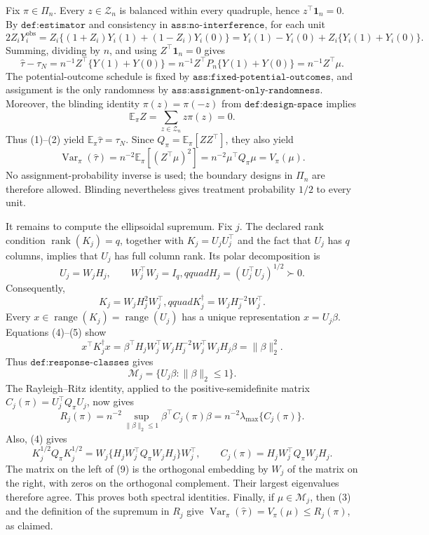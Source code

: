 Fix \(\pi\in\Pi_n\).  Every \(z\in\mathcal Z_n\) is balanced within every quadruple, hence \(z^\top\mathbf 1_n=0\).  By \(\texttt{def:estimator}\) and consistency in \(\texttt{ass:no-interference}\), for each unit
\[
2Z_iY_i^{\mathrm{obs}}
=Z_i\{(1+Z_i)Y_i(1)+(1-Z_i)Y_i(0)\}
=Y_i(1)-Y_i(0)+Z_i\{Y_i(1)+Y_i(0)\}.
\]
Summing, dividing by \(n\), and using \(Z^\top\mathbf 1_n=0\) gives
\[
\widehat\tau-\tau_N
=n^{-1}Z^\top\{Y(1)+Y(0)\}
=n^{-1}Z^\top P_n\{Y(1)+Y(0)\}
=n^{-1}Z^\top\mu. \tag{1}
\]
The potential-outcome schedule is fixed by \(\texttt{ass:fixed-potential-outcomes}\), and assignment is the only randomness by \(\texttt{ass:assignment-only-randomness}\).  Moreover, the blinding identity \(\pi(z)=\pi(-z)\) from \(\texttt{def:design-space}\) implies
\[
\mathbb E_\pi Z=\sum_{z\in\mathcal Z_n}z\pi(z)=0. \tag{2}
\]
Thus (1)--(2) yield \(\mathbb E_\pi\widehat\tau=\tau_N\).  Since \(Q_\pi=\mathbb E_\pi[ZZ^\top]\), they also yield
\[
\operatorname{Var}_\pi(\widehat\tau)
=n^{-2}\mathbb E_\pi[(Z^\top\mu)^2]
=n^{-2}\mu^\top Q_\pi\mu
=V_\pi(\mu). \tag{3}
\]
No assignment-probability inverse is used; the boundary designs in \(\Pi_n\) are therefore allowed.  Blinding nevertheless gives treatment probability \(1/2\) to every unit.

It remains to compute the ellipsoidal supremum.  Fix \(j\).  The declared rank condition \(\operatorname{rank}(K_j)=q\), together with \(K_j=U_jU_j^\top\) and the fact that \(U_j\) has \(q\) columns, implies that \(U_j\) has full column rank.  Its polar decomposition is
\[
U_j=W_jH_j,\qquad W_j^\top W_j=I_q,qquad H_j=(U_j^\top U_j)^{1/2}\succ0. \tag{4}
\]
Consequently,
\[
K_j=W_jH_j^2W_j^\top,qquad
K_j^\dagger=W_jH_j^{-2}W_j^\top. \tag{5}
\]
Every \(x\in\operatorname{range}(K_j)=\operatorname{range}(U_j)\) has a unique representation \(x=U_j\beta\).  Equations (4)--(5) show
\[
x^\top K_j^\dagger x
=\beta^\top H_jW_j^\top W_jH_j^{-2}W_j^\top W_jH_j\beta
=\|\beta\|_2^2. \tag{6}
\]
Thus \(\texttt{def:response-classes}\) gives
\[
\mathcal M_j=\{U_j\beta:\|\beta\|_2\le1\}. \tag{7}
\]
The Rayleigh--Ritz identity, applied to the positive-semidefinite matrix \(C_j(\pi)=U_j^\top Q_\pi U_j\), now gives
\[
R_j(\pi)
=n^{-2}\sup_{\|\beta\|_2\le1}\beta^\top C_j(\pi)\beta
=n^{-2}\lambda_{\max}\{C_j(\pi)\}. \tag{8}
\]
Also, (4) gives
\[
K_j^{1/2}Q_\pi K_j^{1/2}
=W_j\{H_jW_j^\top Q_\pi W_jH_j\}W_j^\top,
\qquad
C_j(\pi)=H_jW_j^\top Q_\pi W_jH_j. \tag{9}
\]
The matrix on the left of (9) is the orthogonal embedding by \(W_j\) of the matrix on the right, with zeros on the orthogonal complement.  Their largest eigenvalues therefore agree.  This proves both spectral identities.  Finally, if \(\mu\in\mathcal M_j\), then (3) and the definition of the supremum in \(R_j\) give \(\operatorname{Var}_\pi(\widehat\tau)=V_\pi(\mu)\le R_j(\pi)\), as claimed.